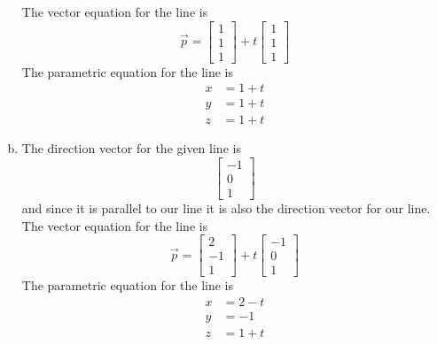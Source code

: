 \documentclass[../main.tex]{subfiles}
\begin{document}
\begin{enumerate}[a)]
		The vector equation for the line is
		\[ \vec{p} = \begin{bmatrix}
					1\\
					1\\
					1
			     \end{bmatrix}
			     + t \begin{bmatrix}
			     1\\
			     1\\
			     1
			     \end{bmatrix} \]
		The parametric equation for the line is
			   \begin{align*}
			   	x &= 1+t\\
				y &= 1+t\\
				z &= 1+t
			   \end{align*}
	\setcounter{enumi}{5}
	\item The direction vector for the given line is
		\[ \begin{bmatrix}-1\\0\\1\end{bmatrix} \]
		and since it is parallel to our line it is also the direction vector for our line.
		The vector equation for the line is
		\[ \vec{p} = \begin{bmatrix}
					2\\
					-1\\
					1
			     \end{bmatrix}
			     + t \begin{bmatrix}
			     -1\\
			     0\\
			     1
			     \end{bmatrix} \]
		The parametric equation for the line is
			   \begin{align*}
			   	x &= 2-t\\
				y &= -1\\
				z &= 1+t
			   \end{align*}
\end{enumerate}
\end{document}
